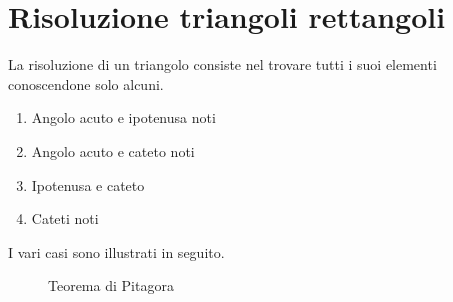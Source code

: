 \section{Risoluzione triangoli rettangoli}
La risoluzione di un triangolo consiste nel trovare tutti i suoi elementi conoscendone solo alcuni. 
\begin{enumerate}
	\item Angolo acuto e ipotenusa noti
	\item Angolo acuto e cateto noti
	\item Ipotenusa e cateto
	\item Cateti noti
\end{enumerate}
I vari casi sono illustrati in seguito. 
\begin{figure}
	\centering
	
	\caption{Teorema di Pitagora}
	\label{fig:TeoremaPitagora_1}
\end{figure}
